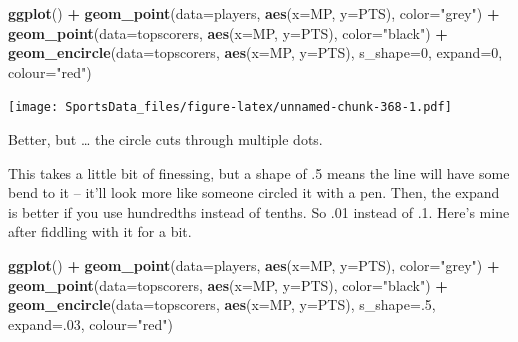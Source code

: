 \documentclass[
]{book}
\newenvironment{Shaded}{\begin{snugshade}}{\end{snugshade}}
\newcommand{\DataTypeTok}[1]{\textcolor[rgb]{0.13,0.29,0.53}{#1}}
\newcommand{\DecValTok}[1]{\textcolor[rgb]{0.00,0.00,0.81}{#1}}
\newcommand{\KeywordTok}[1]{\textcolor[rgb]{0.13,0.29,0.53}{\textbf{#1}}}
\newcommand{\NormalTok}[1]{#1}
\newcommand{\OperatorTok}[1]{\textcolor[rgb]{0.81,0.36,0.00}{\textbf{#1}}}
\newcommand{\StringTok}[1]{\textcolor[rgb]{0.31,0.60,0.02}{#1}}
\begin{document}
\begin{Shaded}
\begin{Highlighting}[]
\KeywordTok{ggplot}\NormalTok{() }\OperatorTok{+}\StringTok{ }
\StringTok{  }\KeywordTok{geom_point}\NormalTok{(}\DataTypeTok{data=}\NormalTok{players, }\KeywordTok{aes}\NormalTok{(}\DataTypeTok{x=}\NormalTok{MP, }\DataTypeTok{y=}\NormalTok{PTS), }\DataTypeTok{color=}\StringTok{"grey"}\NormalTok{) }\OperatorTok{+}\StringTok{ }
\StringTok{  }\KeywordTok{geom_point}\NormalTok{(}\DataTypeTok{data=}\NormalTok{topscorers, }\KeywordTok{aes}\NormalTok{(}\DataTypeTok{x=}\NormalTok{MP, }\DataTypeTok{y=}\NormalTok{PTS), }\DataTypeTok{color=}\StringTok{"black"}\NormalTok{) }\OperatorTok{+}\StringTok{ }
\StringTok{  }\KeywordTok{geom_encircle}\NormalTok{(}\DataTypeTok{data=}\NormalTok{topscorers, }\KeywordTok{aes}\NormalTok{(}\DataTypeTok{x=}\NormalTok{MP, }\DataTypeTok{y=}\NormalTok{PTS), }\DataTypeTok{s_shape=}\DecValTok{0}\NormalTok{, }\DataTypeTok{expand=}\DecValTok{0}\NormalTok{, }\DataTypeTok{colour=}\StringTok{"red"}\NormalTok{)}
\end{Highlighting}
\end{Shaded}

\texttt{[image: SportsData\_files/figure-latex/unnamed-chunk-368-1.pdf]}

Better, but \ldots{} the circle cuts through multiple dots.

This takes a little bit of finessing, but a shape of .5 means the line will have some bend to it -- it'll look more like someone circled it with a pen. Then, the expand is better if you use hundredths instead of tenths. So .01 instead of .1. Here's mine after fiddling with it for a bit.

\begin{Shaded}
\begin{Highlighting}[]
\KeywordTok{ggplot}\NormalTok{() }\OperatorTok{+}\StringTok{ }
\StringTok{  }\KeywordTok{geom_point}\NormalTok{(}\DataTypeTok{data=}\NormalTok{players, }\KeywordTok{aes}\NormalTok{(}\DataTypeTok{x=}\NormalTok{MP, }\DataTypeTok{y=}\NormalTok{PTS), }\DataTypeTok{color=}\StringTok{"grey"}\NormalTok{) }\OperatorTok{+}\StringTok{ }
\StringTok{  }\KeywordTok{geom_point}\NormalTok{(}\DataTypeTok{data=}\NormalTok{topscorers, }\KeywordTok{aes}\NormalTok{(}\DataTypeTok{x=}\NormalTok{MP, }\DataTypeTok{y=}\NormalTok{PTS), }\DataTypeTok{color=}\StringTok{"black"}\NormalTok{) }\OperatorTok{+}\StringTok{ }
\StringTok{  }\KeywordTok{geom_encircle}\NormalTok{(}\DataTypeTok{data=}\NormalTok{topscorers, }\KeywordTok{aes}\NormalTok{(}\DataTypeTok{x=}\NormalTok{MP, }\DataTypeTok{y=}\NormalTok{PTS), }\DataTypeTok{s_shape=}\NormalTok{.}\DecValTok{5}\NormalTok{, }\DataTypeTok{expand=}\NormalTok{.}\DecValTok{03}\NormalTok{, }\DataTypeTok{colour=}\StringTok{"red"}\NormalTok{)}
\end{Highlighting}
\end{Shaded}
\end{document}
